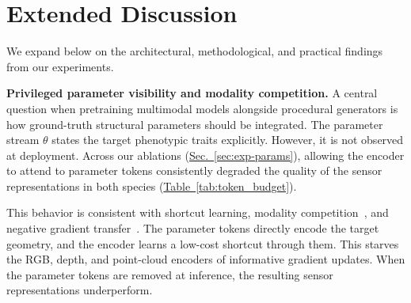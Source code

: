\documentclass[10pt,twocolumn,letterpaper]{article}
\newcommand{\tabref}[1]{\hyperref[#1]{Table~\ref*{#1}}}
\newcommand{\secref}[1]{\hyperref[#1]{Sec.~\ref*{#1}}}
\begin{document}
\section{Extended Discussion}
\label{app:discussion}

We expand below on the architectural, methodological, and practical findings from our experiments.

\noindent\textbf{Privileged parameter visibility and modality competition.}
A central question when pretraining multimodal models alongside procedural generators is how ground-truth structural parameters should be integrated. The parameter stream $\theta$ states the target phenotypic traits explicitly. However, it is not observed at deployment. Across our ablations (\secref{sec:exp-params}), allowing the encoder to attend to parameter tokens consistently degraded the quality of the sensor representations in both species (\tabref{tab:token_budget}).

This behavior is consistent with shortcut learning, modality competition~\citep{peng2022ogm}, and negative gradient transfer~\citep{yu2020pcgrad}. The parameter tokens directly encode the target geometry, and the encoder learns a low-cost shortcut through them. This starves the RGB, depth, and point-cloud encoders of informative gradient updates. When the parameter tokens are removed at inference, the resulting sensor representations underperform.
\end{document}
